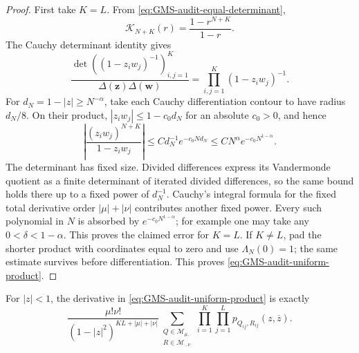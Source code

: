 \begin{proof}
First take $K=L$.  From \eqref{eq:GMS-audit-equal-determinant},
\begin{equation}
 \mathcal K_{N+K}(r)=\frac{1-r^{N+K}}{1-r}.
 \label{eq:GMS-audit-kernel-tail}
\end{equation}
The Cauchy determinant identity gives
\begin{equation}
 \frac{\det((1-z_iw_j)^{-1})_{i,j=1}^{K}}
 {\Delta(\mathbf z)\Delta(\mathbf w)}
 =\prod_{i,j=1}^{K}(1-z_iw_j)^{-1}.
 \label{eq:GMS-audit-Cauchy-determinant}
\end{equation}
For $d_N=1-|z|\geq N^{-\alpha}$, take each Cauchy differentiation contour to have radius
$d_N/8$.  On their product, $|z_iw_j|\leq1-c_0d_N$ for an absolute $c_0>0$, and hence
\begin{equation}
 \left|\frac{(z_iw_j)^{N+K}}{1-z_iw_j}\right|
 \leq C d_N^{-1}e^{-c_0Nd_N}
 \leq C N^\alpha e^{-c_0N^{1-\alpha}}.
 \label{eq:GMS-audit-tail-bound}
\end{equation}
The determinant has fixed size.  Divided differences express its Vandermonde quotient as a
finite determinant of iterated divided differences, so the same bound holds there up to a
fixed power of $d_N^{-1}$.  Cauchy's integral formula for the fixed total derivative order
$|\mu|+|\nu|$ contributes another fixed power.  Every such polynomial in $N$ is absorbed by
$e^{-c_0N^{1-\alpha}}$; for example one may take any
$0<\delta<1-\alpha$.  This proves the claimed error for $K=L$.  If $K\ne L$, pad the shorter
product with coordinates equal to zero and use $\Lambda_N(0)=1$; the same estimate survives
before differentiation.  This proves \eqref{eq:GMS-audit-uniform-product}.
\end{proof}

\begin{lemma}
\label{lem:GMS-audit-coefficient-extraction}
For $|z|<1$, the derivative in \eqref{eq:GMS-audit-uniform-product} is exactly
\begin{equation}
 \frac{\mu!\nu!}{(1-|z|^2)^{KL+|\mu|+|\nu|}}
 \sum_{\substack{Q\in\mathcal M_{\mu,\cdot}\\R\in\mathcal M_{\cdot,\nu}}}
 \prod_{i=1}^{K}\prod_{j=1}^{L}p_{Q_{ij},R_{ij}}(z,\overline z).
 \label{eq:GMS-audit-coefficient-result}
\end{equation}
\end{lemma}

